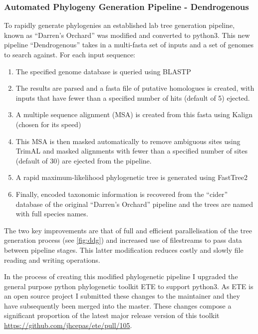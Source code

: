 \subsubsection{Automated Phylogeny Generation Pipeline - Dendrogenous}

To rapidly generate phylogenies an established lab tree generation pipeline, known as ``Darren's Orchard'' 
\citep{Richards2009g} was modified and converted to python3.  This new pipeline ``Dendrogenous'' 
takes in a multi-fasta set of inputs and a set of genomes to search against.
For each input sequence:
\begin{enumerate} 
    \item The specified genome database is queried using BLASTP
    \item The results are parsed and a fasta file of putative homologues is created, with inputs that have fewer than a specified 
        number of hits (default of 5) ejected.
    \item A multiple sequence alignment (MSA) is created from this fasta using Kalign (chosen for its speed) \citep{Lassmann2009}
    \item This MSA is then masked automatically to remove ambiguous sites using TrimAL \citep{Capella-Gutierrez2009} and masked alignments
        with fewer than a specified number of sites (default of 30) are ejected from the pipeline.
    \item A rapid maximum-likelihood phylogenetic tree is generated using FastTree2 \citep{Price2010}
    \item Finally, encoded taxonomic information is recovered from the ``cider'' database of the original ``Darren's Orchard'' pipeline 
        and the trees are named with full species names.
\end{enumerate}
The two key improvements are that of full and efficient parallelisation of the tree generation process (see \ref{fig:ddg})
and increased use of filestreams to pass data between pipeline stages.  This latter modification reduces costly and slowly
file reading and writing operations.

In the process of creating this modified phylogenetic pipeline I upgraded the general purpose python phylogenetic toolkit
ETE \citep{Huerta-Cepas2010} to support python3.  As ETE is an open source project I submitted these changes
to the maintainer and they have subsequently been merged into the master.  These changes compose a significant proportion of
the latest major release version of this toolkit \url{https://github.com/jhcepas/ete/pull/105}.

